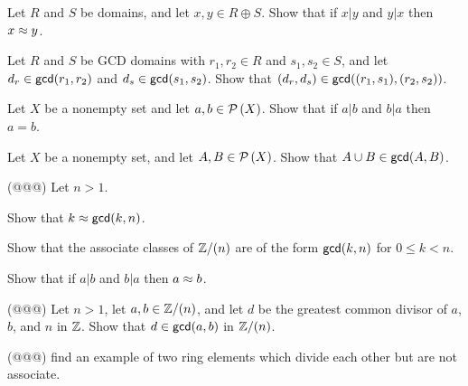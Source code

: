 \Exercises%

\begin{exercise}
Let \(R\) and \(S\) be domains, and let \(x,y \in R \oplus S\). Show that if \(x|y\) and \(y|x\) then \(x \approx y\).
\end{exercise}

\begin{exercise}
Let \(R\) and \(S\) be GCD domains with \(r_1,r_2 \in R\) and \(s_1,s_2 \in S\), and let \(d_r \in \mathsf{gcd}(r_1, r_2)\) and \(d_s \in \mathsf{gcd}(s_1, s_2)\). Show that \((d_r, d_s) \in \mathsf{gcd}((r_1,s_1), (r_2,s_2))\).
\end{exercise}

\begin{exercise}
Let \(X\) be a nonempty set and let \(a,b \in \mathcal{P}\left(X\right)\). Show that if \(a|b\) and \(b|a\) then \(a = b\).
\end{exercise}

\begin{exercise}
Let \(X\) be a nonempty set, and let \(A, B \in \mathcal{P}\left(X\right)\). Show that \(A \cup B \in \mathsf{gcd}(A, B)\).
\end{exercise}

\begin{exercise}
(@@@) Let \(n > 1\).
\begin{proplist*}
\item Show that \(k \approx \mathsf{gcd}(k, n)\).
\item Show that the associate classes of \(\mathbb{Z}/(n)\) are of the form \(\mathsf{gcd}(k, n)\) for \(0 \leq k < n\).
\item Show that if \(a|b\) and \(b|a\) then \(a \approx b\).
\end{proplist*}
\end{exercise}

\begin{exercise}
(@@@) Let \(n > 1\), let \(a,b \in \mathbb{Z}/(n)\), and let \(d\) be the greatest common divisor of \(a\), \(b\), and \(n\) in \(\mathbb{Z}\). Show that \(d \in \mathsf{gcd}(a, b)\) in \(\mathbb{Z}/(n)\).
\end{exercise}

\begin{exercise}
(@@@) find an example of two ring elements which divide each other but are not associate.
\end{exercise}

